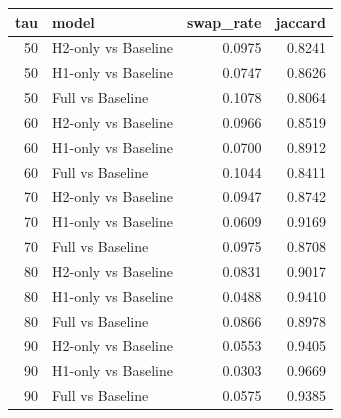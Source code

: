 \begin{tabular}{rlrr}
\toprule
tau & model & swap_rate & jaccard \\
\midrule
50 & H2-only vs Baseline & 0.0975 & 0.8241 \\
50 & H1-only vs Baseline & 0.0747 & 0.8626 \\
50 & Full vs Baseline & 0.1078 & 0.8064 \\
60 & H2-only vs Baseline & 0.0966 & 0.8519 \\
60 & H1-only vs Baseline & 0.0700 & 0.8912 \\
60 & Full vs Baseline & 0.1044 & 0.8411 \\
70 & H2-only vs Baseline & 0.0947 & 0.8742 \\
70 & H1-only vs Baseline & 0.0609 & 0.9169 \\
70 & Full vs Baseline & 0.0975 & 0.8708 \\
80 & H2-only vs Baseline & 0.0831 & 0.9017 \\
80 & H1-only vs Baseline & 0.0488 & 0.9410 \\
80 & Full vs Baseline & 0.0866 & 0.8978 \\
90 & H2-only vs Baseline & 0.0553 & 0.9405 \\
90 & H1-only vs Baseline & 0.0303 & 0.9669 \\
90 & Full vs Baseline & 0.0575 & 0.9385 \\
\bottomrule
\end{tabular}
